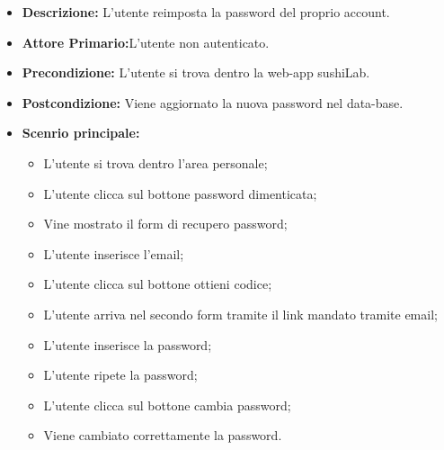 \begin{itemize}
    \item \textbf{Descrizione:} L'utente reimposta la password del proprio account.
    \item \textbf{Attore Primario:}L'utente non autenticato.
    \item \textbf{Precondizione:} L'utente si trova dentro la web-app sushiLab.
    \item \textbf{Postcondizione:} Viene aggiornato la nuova password nel data-base.
    \item \textbf{Scenrio principale:}
    \begin{itemize}
        \item L'utente si trova dentro l'area personale;
        \item L'utente clicca sul bottone password dimenticata;
        \item Vine mostrato il form di recupero password;
        \item L'utente inserisce l'email;
        \item L'utente clicca sul bottone ottieni codice;
        \item L'utente arriva nel secondo form tramite il link mandato tramite email;
        \item L'utente inserisce la password;
        \item L'utente ripete la password;
        \item L'utente clicca sul bottone cambia password;
        \item Viene cambiato correttamente la password.
    \end{itemize}
\end{itemize}
